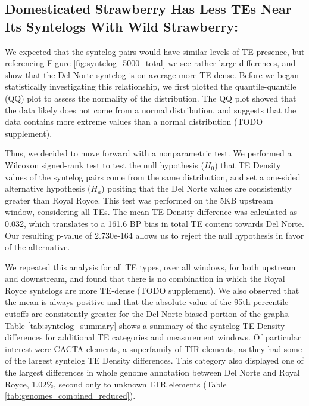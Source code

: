 \documentclass[fleqn,10pt]{olplainarticle}
\begin{document}
\subsection{Domesticated Strawberry Has Less TEs Near Its Syntelogs With Wild Strawberry:}
We expected that the syntelog pairs would have similar levels of TE presence, but referencing Figure \ref{fig:syntelog_5000_total} we see rather large differences, and show that the Del Norte syntelog is on average more TE-dense.
Before we began statistically investigating this relationship, we first plotted the quantile-quantile (QQ) plot to assess the normality of the distribution.
The QQ plot showed that the data likely does not come from a normal distribution, and suggests that the data contains more extreme values than a normal distribution (TODO supplement).

Thus, we decided to move forward with a nonparametric test.
We performed a Wilcoxon signed-rank test to test the null hypothesis ($H_{0}$) that TE Density values of the syntelog pairs come from the same distribution, and set a one-sided alternative hypothesis ($H_{a}$) positing that the Del Norte values are consistently greater than Royal Royce.
This test was performed on the 5KB upstream window, considering all TEs.
The mean TE Density difference was calculated as 0.032, which translates to a 161.6 BP bias in total TE content towards Del Norte.
Our resulting p-value of 2.730e-164 allows us to reject the null hypothesis in favor of the alternative.

We repeated this analysis for all TE types, over all windows, for both upstream and downstream, and found that there is no combination in which the Royal Royce syntelogs are more TE-dense (TODO supplement).
We also observed that the mean is always positive and that the absolute value of the 95th percentile cutoffs are consistently greater for the Del Norte-biased portion of the graphs.
Table \ref{tab:syntelog_summary} shows a summary of the syntelog TE Density differences for additional TE categories and measurement windows.
Of particular interest were CACTA elements, a superfamily of TIR elements, as they had some of the largest syntelog TE Density differences.
This category also displayed one of the largest differences in whole genome annotation between Del Norte and Royal Royce, 1.02\%, second only to unknown LTR elements (Table \ref{tab:genomes_combined_reduced}).
\end{document}
